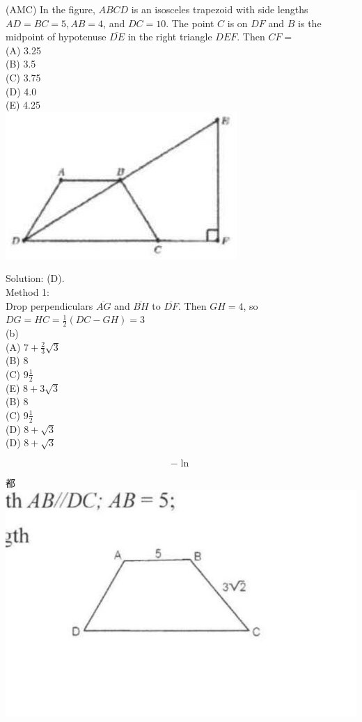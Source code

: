 \documentclass{article}
\begin{document}
(AMC) In the figure, \(A B C D\) is an isosceles trapezoid with side lengths \(A D=B C=5, A B=4\), and \(D C=10\). The point \(C\) is on \(D F\) and \(B\) is the midpoint of hypotenuse \(\overline{D E}\) in the right triangle \(D E F\). Then \(C F=\)\\
(A) 3.25\\
(B) 3.5\\
(C) 3.75\\
(D) 4.0\\
(E) 4.25\\
\centering
\includegraphics[width=\textwidth]{images/076(1).jpg}

Solution: (D).\\
Method 1:\\
Drop perpendiculars \(\overline{A G}\) and \(\overline{B H}\) to \(\overline{D F}\). Then \(G H=4\), so \(D G=H C=\frac{1}{2}(D C-G H)=3\)\\
(b)\\
(A) \(7+\frac{2}{3} \sqrt{3}\)\\
(B) 8\\
(C) \(9 \frac{1}{2}\)\\
(E) \(8+3 \sqrt{3}\)\\
(B) 8\\
(C) \(9 \frac{1}{2}\)\\
(D) \(8+\sqrt{3}\)\\
(D) \(8+\sqrt{3}\)

\[
-\ln
\]

都\\
\centering
\includegraphics[width=\textwidth]{images/076.jpg}
\end{document}
